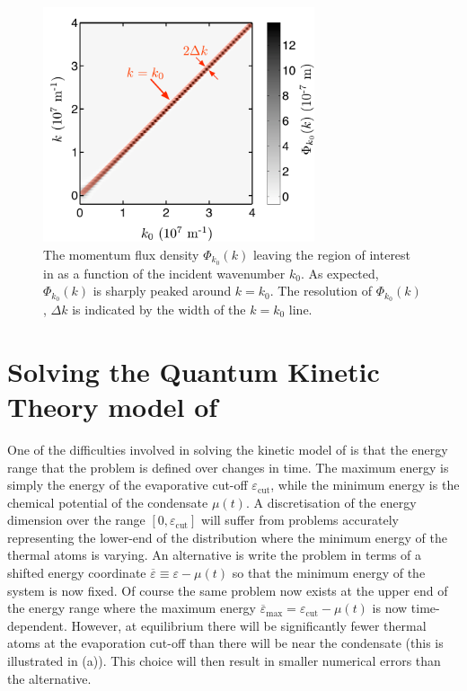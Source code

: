 \begin{figure}
    \centering
    \includegraphics[width=8cm]{PhiAccuracy}
    \caption{\label{MethodsAppendix:PhiAccuracy} The momentum flux density $\Phi_{k_0}(k)$ leaving the region of interest in  as a function of the incident wavenumber $k_0$. As expected, $\Phi_{k_0}(k)$ is sharply peaked around $k=k_0$. The resolution of $\Phi_{k_0}(k)$, $\Delta k$ is indicated by the width of the $k=k_0$ line.}
\end{figure}

\section[Solving the Quantum Kinetic Theory model]{Solving the Quantum Kinetic Theory model of }
\label{MethodsAppendix:KineticTheory}

One of the difficulties involved in solving the kinetic model of  is that the energy range that the problem is defined over changes in time.  The maximum energy is simply the energy of the evaporative cut-off $\varepsilon_\text{cut}$, while the minimum energy is the chemical potential of the condensate $\mu(t)$.  A discretisation of the energy dimension over the range $[0, \varepsilon_\text{cut}]$ will suffer from problems accurately representing the lower-end of the distribution where the minimum energy of the thermal atoms is varying.  An alternative is write the problem in terms of a shifted energy coordinate $\overline{\varepsilon} \equiv \varepsilon - \mu(t)$ so that the minimum energy of the system is now fixed.  Of course the same problem now exists at the upper end of the energy range where the maximum energy $\overline{\varepsilon}_\text{max} = \varepsilon_\text{cut} - \mu(t)$ is now time-dependent.  However, at equilibrium there will be significantly fewer thermal atoms at the evaporation cut-off than there will be near the condensate (this is illustrated in (a)).  This choice will then result in smaller numerical errors than the alternative.

